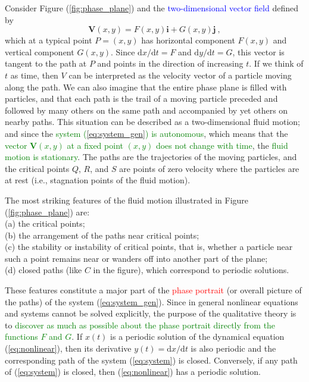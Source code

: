 \documentclass[12pt,a4paper]{article}
\renewcommand{\vec}[1]{\boldsymbol{#1}}
\newcommand{\dif}{\mathrm{d}}
\newcounter{theo}[section]\setcounter{theo}{0}
\begin{document}
Consider Figure (\ref{fig:phase_plane}) and the \textcolor{blue}{two-dimensional vector field} defined by
\begin{equation}
\vec{V}(x,y) = F(x,y) \vec{i} + G(x,y) \vec{j} ~,
\end{equation}
which at a typical point $P=(x,y)$ has horizontal component $F(x,y)$ and vertical component $G(x,y)$. Since $\dif x/\dif t= F$ and $\dif y/\dif t = G$, this vector is tangent to the path at $P$ and points in the direction of increasing $t$. If we think of $t$ as time, then $V$ can be interpreted as the velocity vector of a particle moving along the path. We can also imagine that the entire phase plane is filled with particles, and that each path is the trail of a moving particle preceded and followed by many others on the same path and accompanied by yet others on nearby paths. This situation can be described as a two-dimensional fluid motion; and since the \textcolor{green}{system (\ref{eq:system_gen}) is autonomous}, which means that the \textcolor{green}{vector $\vec{V}(x,y)$ at a fixed point $(x,y)$ does not change with time}, the \textcolor{green}{fluid motion is stationary}. The paths are the trajectories of the moving particles, and the critical points $Q$, $R$, and $S$ are points of zero velocity where the particles are at rest (i.e., stagnation points of the fluid motion).

The most striking features of the fluid motion illustrated in Figure (\ref{fig:phase_plane}) are: \\
(a) the critical points; \\
(b) the arrangement of the paths near critical points; \\
(c) the stability or instability of critical points, that is, whether a particle near such a point remains near or wanders off into another part of the plane; \\
(d) closed paths (like $C$ in the figure), which correspond to periodic solutions.

These features constitute a major part of the \textcolor{red}{phase portrait} (or overall picture of the paths) of the system (\ref{eq:system_gen}).  Since in general nonlinear equations and systems cannot be solved explicitly, the purpose of the qualitative theory is to \textcolor{green}{discover as much as possible about the phase portrait directly from the functions $F$ and $G$}. If $x(t)$ is a periodic solution of the dynamical equation (\ref{eq:nonlinear}), then its derivative $y(t)= \dif x/\dif t$ is also periodic and the corresponding path of the system (\ref{eq:system}) is closed. Conversely, if any path of (\ref{eq:system}) is closed, then (\ref{eq:nonlinear}) has a periodic solution. 
\end{document}
